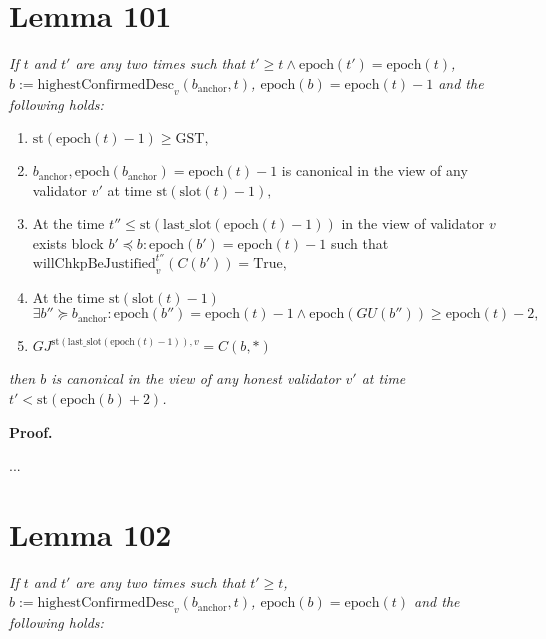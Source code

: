 \documentclass{article}
\begin{document}
\section*{Lemma 101}
\textit{If $t$ and $t'$ are any two times such that $t' \geq t \wedge \text{epoch}(t') = \text{epoch}(t)$, $b := \text{highestConfirmedDesc}_v(b_{\text{anchor}}, t)$, $\text{epoch}(b) = \text{epoch}(t) - 1$ and the following holds:}

\begin{enumerate}
    \item $\text{st}(\text{epoch}(t) - 1) \geq \text{GST},$
    \item $b_{\text{anchor}}, \text{epoch}(b_{\text{anchor}}) = \text{epoch}(t) - 1$ is canonical in the view of any validator $v'$ at time $\text{st}(\text{slot}(t) - 1),$
    \item At the time $t'' \leq \text{st}(\text{last\_slot}(\text{epoch}(t) - 1))$ in the view of validator $v$ exists block $b' \preceq b : \text{epoch}(b') = \text{epoch}(t) - 1$ such that $\text{willChkpBeJustified}^{t''}_v(C(b')) = \text{True},$
    \item At the time $\text{st}(\text{slot}(t) - 1)$ $\exists b'' \succeq b_{\text{anchor}} : \text{epoch}(b'') = \text{epoch}(t) - 1 \wedge \text{epoch}(GU(b'')) \geq \text{epoch}(t) - 2,$
    \item $GJ^{\text{st}(\text{last\_slot}(\text{epoch}(t) - 1)),v} = C(b, *)$
\end{enumerate}

\textit{then $b$ is canonical in the view of any honest validator $v'$ at time $t' < \text{st}(\text{epoch}(b) + 2)$.}

\textbf{Proof.}

...

\section*{Lemma 102}
\textit{If $t$ and $t'$ are any two times such that $t' \geq t$, $b := \text{highestConfirmedDesc}_v(b_{\text{anchor}}, t)$, $\text{epoch}(b) = \text{epoch}(t)$ and the following holds:}
\end{document}
